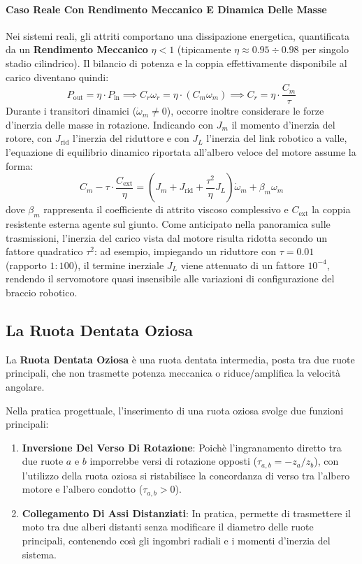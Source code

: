﻿\documentclass[11pt, a4paper]{article}
\begin{document}
\paragraph{Caso Reale Con Rendimento Meccanico E Dinamica Delle Masse}
Nei sistemi reali, gli attriti comportano una dissipazione energetica, quantificata da un \textbf{Rendimento Meccanico} $\eta < 1$ (tipicamente $\eta \approx 0.95 \div 0.98$ per singolo stadio cilindrico). Il bilancio di potenza e la coppia effettivamente disponibile al carico diventano quindi:
\[
    P_{\text{out}} = \eta \cdot P_{\text{in}} \implies C_r \omega_r = \eta \cdot (C_m \omega_m) \implies C_r = \eta \cdot \frac{C_m}{\tau}
\]
Durante i transitori dinamici ($\dot{\omega}_m \neq 0$), occorre inoltre considerare le forze d'inerzia delle masse in rotazione. Indicando con $J_m$ il momento d'inerzia del rotore, con $J_{\text{rid}}$ l'inerzia del riduttore e con $J_L$ l'inerzia del link robotico a valle, l'equazione di equilibrio dinamico riportata all'albero veloce del motore assume la forma:
\[
    C_m - \tau \cdot \frac{C_{\text{ext}}}{\eta} = \left( J_m + J_{\text{rid}} + \frac{\tau^2}{\eta} J_L \right) \dot{\omega}_m + \beta_m \omega_m
\]
dove $\beta_m$ rappresenta il coefficiente di attrito viscoso complessivo e $C_{\text{ext}}$ la coppia resistente esterna agente sul giunto. Come anticipato nella panoramica sulle trasmissioni, l'inerzia del carico vista dal motore risulta ridotta secondo un fattore quadratico $\tau^2$: ad esempio, impiegando un riduttore con $\tau = 0.01$ (rapporto $1:100$), il termine inerziale $J_L$ viene attenuato di un fattore $10^{-4}$, rendendo il servomotore quasi insensibile alle variazioni di configurazione del braccio robotico.
\newpage

\subsection{La Ruota Dentata Oziosa}
La \textbf{Ruota Dentata Oziosa} è una ruota dentata intermedia, posta tra due ruote principali, che non trasmette potenza meccanica o riduce/amplifica la velocità angolare.

Nella pratica progettuale, l'inserimento di una ruota oziosa svolge due funzioni principali:
\begin{enumerate}
    \item \textbf{Inversione Del Verso Di Rotazione}: Poichè l'ingranamento diretto tra due ruote $a$ e $b$ imporrebbe versi di rotazione opposti ($\tau_{a,b} = -z_a/z_b$), con l'utilizzo della ruota oziosa si ristabilisce la concordanza di verso tra l'albero motore e l'albero condotto ($\tau_{a,b} > 0$).
    \item \textbf{Collegamento Di Assi Distanziati}: In pratica, permette di trasmettere il moto tra due alberi distanti senza modificare il diametro delle ruote principali, contenendo così gli ingombri radiali e i momenti d'inerzia del sistema.
\end{enumerate}
\end{document}
